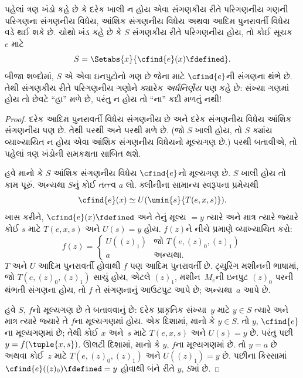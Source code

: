 \begin{explain}
પહેલાં ત્રણ ખંડો કહે છે કે દરેક ખાલી ન હોય એવા સંગણકીય રીતે
પરિગણનીય ગણની પરિગણના સંગણનીય વિધેય, આંશિક સંગણનીય વિધેય
અથવા આદિમ પુનરાવર્તી વિધેય વડે થઈ શકે છે. ચોથો ખંડ કહે છે કે
$S$ સંગણકીય રીતે પરિગણનીય હોય, તો કોઈ સૂચક~$e$ માટે
\[
S = \Setabs{x}{\cfind{e}(x) \fdefined}.
\]
બીજા શબ્દોમાં, $S$ એ એવા ઇનપુટોનો ગણ છે જેના માટે
$\cfind{e}$ની સંગણના થંભે છે. તેથી સંગણકીય રીતે પરિગણનીય
ગણોને ક્યારેક \emph{અર્ધનિર્ણેય} પણ કહે છે: સંખ્યા ગણમાં હોય
તો છેવટે ``હા'' મળે છે, પરંતુ ન હોય તો ``ના'' કદી મળતું નથી!{}
\end{explain}

\begin{proof}
દરેક આદિમ પુનરાવર્તી વિધેય સંગણનીય છે અને દરેક સંગણનીય વિધેય
આંશિક સંગણનીય પણ છે. તેથી  પરથી
 અને  પરથી
 મળે છે. (જો $S$ ખાલી હોય, તો $S$ ક્યાંય
વ્યાખ્યાયિત ન હોય એવા આંશિક સંગણનીય વિધેયનો મૂલ્યગણ છે.)
 પરથી  બતાવીએ,
તો પહેલાં ત્રણ ખંડોની સમકક્ષતા સાબિત થશે.

હવે માનો કે $S$ આંશિક સંગણનીય વિધેય $\cfind{e}$નો મૂલ્યગણ
છે. $S$ ખાલી હોય તો કામ પૂરું. અન્યથા $S$નું કોઈ તત્ત્વ $a$
લો. ક્લીનીના સામાન્ય સ્વરૂપના પ્રમેયથી
\[
\cfind{e}(x) \simeq U(\umin{s}{T(e, x, s)}).
\]
ખાસ કરીને, $\cfind{e}(x) \fdefined$ અને તેનું મૂલ્ય $= y$
ત્યારે અને માત્ર ત્યારે જ્યારે કોઈ $s$ માટે $T(e, x, s)$
અને $U(s) = y$ હોય. $f(z)$ને નીચે પ્રમાણે વ્યાખ્યાયિત કરો:
\[
f(z) = \begin{cases}
  U((z)_1) & \text{જો $T(e, (z)_0, (z)_1)$} \\
  a        & \text{અન્યથા.}
\end{cases}
\]
$T$ અને $U$ આદિમ પુનરાવર્તી હોવાથી $f$ પણ આદિમ પુનરાવર્તી
છે. ટ્યુરિંગ મશીનની ભાષામાં, જો $T(e,(z)_0,(z)_1)$
  સાચું હોય, એટલે $(z)_1$,
  મશીન~$M_e$ની ઇનપુટ $(z)_0$ પરની થંભતી સંગણના હોય,
  તો $f$ તે સંગણનાનું આઉટપુટ આપે છે; અન્યથા~$a$ આપે છે.

હવે $S$, $f$નો મૂલ્યગણ છે તે બતાવવાનું છે: દરેક પ્રાકૃતિક
સંખ્યા~$y$ માટે $y \in S$ ત્યારે અને માત્ર ત્યારે જ્યારે
તે $f$ના મૂલ્યગણમાં હોય. એક દિશામાં, માનો કે $y \in S$.
તો $y$, $\cfind{e}$ના મૂલ્યગણમાં છે; તેથી કોઈ $x$ અને~$s$
માટે $T(e,x,s)$ અને $U(s) = y$ છે. પરંતુ પછી
$y = f(\tuple{x,s})$. ઊલટી દિશામાં, માનો કે $y$, $f$ના
મૂલ્યગણમાં છે. તો $y = a$ છે અથવા કોઈ~$z$ માટે
$T(e,(z)_0,(z)_1)$ અને $U((z)_1) = y$ છે. પછીના કિસ્સામાં
$\cfind{e}((z)_0) \fdefined = y$ હોવાથી બંને રીતે $y$,
$S$માં છે.


\end{proof}
